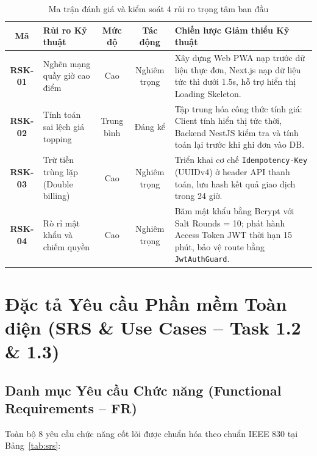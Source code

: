 \documentclass[a4paper]{article}
\begin{document}
\begin{table}[H]
\centering
\small
\begin{tabular}{|c|>{\raggedright\arraybackslash}p{2.6cm}|c|c|>{\raggedright\arraybackslash}p{6.8cm}|}
\hline
\textbf{Mã} & \textbf{Rủi ro Kỹ thuật} & \textbf{Mức độ} & \textbf{Tác động} & \textbf{Chiến lược Giảm thiểu Kỹ thuật} \\ \hline
\textbf{RSK-01} & Nghẽn mạng quầy giờ cao điểm & Cao & Nghiêm trọng & Xây dựng Web PWA nạp trước dữ liệu thực đơn, Next.js nạp dữ liệu tức thì dưới 1.5s, hỗ trợ hiển thị Loading Skeleton. \\ \hline
\textbf{RSK-02} & Tính toán sai lệch giá topping & Trung bình & Đáng kể & Tập trung hóa công thức tính giá: Client tính hiển thị tức thời, Backend NestJS kiểm tra và tính toán lại trước khi ghi đơn vào DB. \\ \hline
\textbf{RSK-03} & Trừ tiền trùng lặp (Double billing) & Cao & Nghiêm trọng & Triển khai cơ chế \texttt{Idempotency-Key} (UUIDv4) ở header API thanh toán, lưu hash kết quả giao dịch trong 24 giờ. \\ \hline
\textbf{RSK-04} & Rò rỉ mật khẩu và chiếm quyền & Cao & Nghiêm trọng & Băm mật khẩu bằng Bcrypt với Salt Rounds = 10; phát hành Access Token JWT thời hạn 15 phút, bảo vệ route bằng \texttt{JwtAuthGuard}. \\ \hline
\end{tabular}
\caption{Ma trận đánh giá và kiểm soát 4 rủi ro trọng tâm ban đầu}
\label{tab:risks}
\end{table}

\newpage
\section{Đặc tả Yêu cầu Phần mềm Toàn diện (SRS \& Use Cases -- Task 1.2 \& 1.3)}

\subsection{Danh mục Yêu cầu Chức năng (Functional Requirements -- FR)}
Toàn bộ 8 yêu cầu chức năng cốt lõi được chuẩn hóa theo chuẩn IEEE 830 tại Bảng~\ref{tab:srs}:
\end{document}
